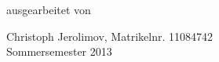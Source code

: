 \begin{center}
\vspace{2.0cm}

\begin{large}
	ausgearbeitet von\\
	\vspace{0.2cm}
\end{large}

\begin{Large}
	Christoph Jerolimov, Matrikelnr. 11084742\\
	\vspace{0.5cm}
	Sommersemester 2013
\end{Large}

\end{center}

\onehalfspacing

\mainmatter

	\setcounter{chapter}{2}
	\setcounter{table}{1}
	\setcounter{figure}{1}
	


